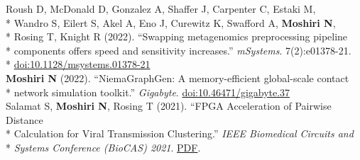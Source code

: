 \documentclass[margin,line]{res}
\begin{document}
\begin{resume}
\hspace*{9.5mm} Roush D, McDonald D, Gonzalez A, Shaffer J, Carpenter C, Estaki M,\\*
\hspace*{9.5mm} Wandro S, Eilert S, Akel A, Eno J, Curewitz K, Swafford A, \textbf{Moshiri N},\\*
\hspace*{9.5mm} Rosing T, Knight R (2022). ``Swapping metagenomics preprocessing pipeline\\*
\hspace*{9.5mm} components offers speed and sensitivity increases.'' \textit{mSystems}. 7(2):e01378-21.\\*\vspace{2mm}
\hspace*{8mm} \href{https://doi.org/10.1128/msystems.01378-21}{doi:10.1128/msystems.01378-21}\\
\hspace*{4mm} \textbf{Moshiri N} (2022). ``NiemaGraphGen: A memory-efficient global-scale contact\\*\vspace{2mm}
\hspace*{8mm} network simulation toolkit.'' \textit{Gigabyte}. \href{https://doi.org/10.46471/gigabyte.37}{doi:10.46471/gigabyte.37}\\
\hspace*{4mm} Salamat S, \textbf{Moshiri N}, Rosing T (2021). ``FPGA Acceleration of Pairwise Distance\\*
\hspace*{9.5mm} Calculation for Viral Transmission Clustering.'' \textit{IEEE Biomedical Circuits and}\\*\vspace{2mm}
\hspace*{8mm} \textit{Systems Conference (BioCAS) 2021}. \href{https://par.nsf.gov/servlets/purl/10323850}{PDF}.\\

\end{resume}
\end{document}
